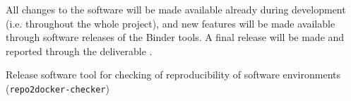 \begin{workpackage}[
  id=reproducibility,
  wphases=0-36!1.03,
  title=Improving robustness of reproducibility tools,
  short=Robustness,
  lead=QS,
  SRLRM=23,
  UIORM=0,
  MPRM=2,
  QSRM=12,
  swsites,
]
\begin{wpdescription}
All changes to the software will be made available already during development
(i.e. throughout the whole project), and new features will be made available
through software releases of the Binder tools. A final release will be made and
reported through the deliverable .

%

\end{wpdescription}

\begin{tasklist}






\end{tasklist}


\begin{wpdelivs}


  \begin{wpdeliv}[due=24,miles=prototype,id=deliv-id-repo2docker-checker-software,dissem=PU,nature=OTHER,lead=SRL]
    {Release software tool for checking of reproducibility of software
      environments (\texttt{repo2docker-checker})}
  \end{wpdeliv}


\end{wpdelivs}
\end{workpackage}
